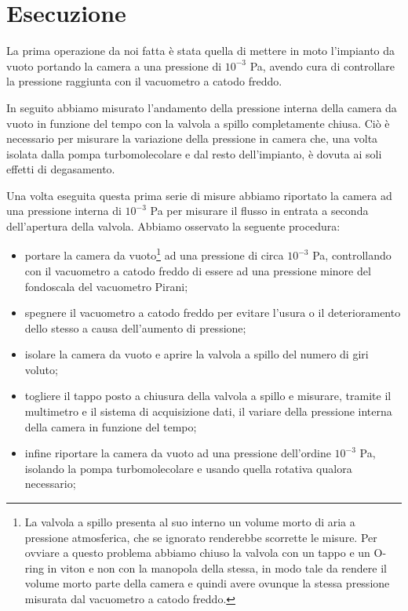 \section{Esecuzione}

La prima operazione da noi fatta è stata quella di mettere in moto l'impianto da vuoto portando la camera a una pressione di $10^{-3}$ \si{\pascal}, avendo cura di controllare la pressione raggiunta con il vacuometro a catodo freddo.

In seguito abbiamo misurato l'andamento della pressione interna della camera da vuoto in funzione del tempo con la valvola a spillo completamente chiusa. Ciò è necessario per misurare la variazione della pressione in camera che, una volta isolata dalla pompa turbomolecolare e dal resto dell'impianto, è dovuta ai soli effetti di degasamento.

Una volta eseguita questa prima serie di misure abbiamo riportato la camera ad una pressione interna di $10^{-3}$ \si{\pascal} per misurare il flusso in entrata a seconda dell'apertura della valvola. Abbiamo osservato la seguente procedura:
\begin{itemize}
	\item{portare la camera da vuoto\footnote{La valvola a spillo presenta al suo interno un volume morto di aria a pressione atmosferica, che se ignorato renderebbe scorrette le misure. Per ovviare a questo problema abbiamo chiuso la valvola con un tappo e un O-ring in viton e non con la manopola della stessa, in modo tale da rendere il volume morto parte della camera e quindi avere ovunque la stessa pressione misurata dal vacuometro a catodo freddo.} ad una pressione di circa $10^{-3}$ \si{\pascal}, controllando con il vacuometro a catodo freddo di essere ad una pressione minore del fondoscala del vacuometro Pirani;}
	\item{spegnere il vacuometro a catodo freddo per evitare l'usura o il deterioramento dello stesso a causa dell'aumento di pressione;}
	\item{isolare la camera da vuoto e aprire la valvola a spillo del numero di giri voluto;}
	\item{togliere il tappo posto a chiusura della valvola a spillo e misurare, tramite il multimetro e il sistema di acquisizione dati, il variare della pressione interna della camera in funzione del tempo;}
	\item{infine riportare la camera da vuoto ad una pressione dell'ordine $10^{-3}$ \si{\pascal}, isolando la pompa turbomolecolare e usando quella rotativa qualora necessario;}
\end{itemize}

